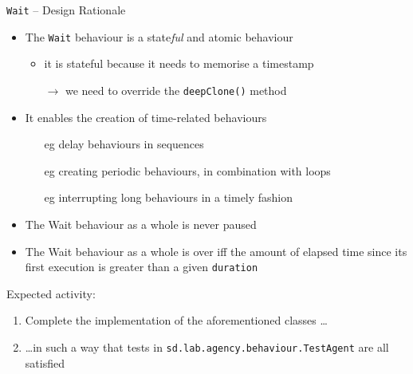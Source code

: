 \documentclass[presentation]{beamer}\mode<presentation>{\usetheme{AMSCesenaPurpleAndGold}}
\begin{document}
\begin{frame}[c, allowframebreaks]
    \begin{exampleblock}{\texttt{Wait} -- Design Rationale}
        \begin{itemize}
            \item The \texttt{Wait} behaviour is a \alert{state\emph{ful}} and \alert{atomic} behaviour
            \begin{itemize}
                \item it is stateful because it needs to memorise a \alert{timestamp}
                \item[$\rightarrow$] we need to override the \texttt{\alert{deepClone()}} method
            \end{itemize}

            \medskip

            \item It enables the creation of time-related behaviours
            \begin{itemize}
                \item[eg] \alert{delay} behaviours in sequences
                \item[eg] creating \alert{periodic} behaviours, in combination with loops
                \item[eg] \alert{interrupting} long behaviours in a timely fashion
            \end{itemize}


            \medskip

            \item The Wait behaviour as a whole is \alert{never paused}

            \medskip

            \item The Wait behaviour as a whole is \alert{over} iff the amount of elapsed time since its first execution is greater than a given \alert{\texttt{duration}}

        \end{itemize}
    \end{exampleblock}

    \framebreak

    Expected activity:
    \bigskip
    \begin{enumerate}

        \item Complete the implementation of the aforementioned classes \ldots

        \bigskip

        \item \ldots in such a way that tests in \texttt{sd.lab.agency.behaviour.\alert{TestAgent}} are all satisfied


\end{enumerate}
\end{frame}
\end{document}
